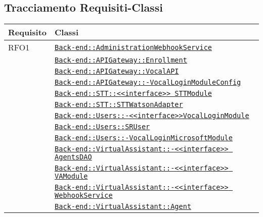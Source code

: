 \subsection{Tracciamento Requisiti-Classi}
\normalsize
\begin{longtable}{|>{\centering}m{3cm}|m{10cm}<{\centering}|}
\hline 
\textbf{Requisito} & \textbf{Classi}\\
\hline
\endhead
RFO1 & \hyperref[Back-end::AdministrationWebhookService]{\texttt{Back-end::AdministrationWebhookService}}\\
& \hyperref[Back-end::APIGateway::Enrollment]{\texttt{Back-end::APIGateway::Enrollment}}\\
& \hyperref[Back-end::APIGateway::VocalAPI]{\texttt{Back-end::APIGateway::VocalAPI}}\\
& \hyperref[Back-end::APIGateway::VocalLoginModuleConfig]{\texttt{Back-end::APIGateway::-\linebreak VocalLoginModuleConfig}}\\
& \hyperref[Back-end::STT::<<interface>> STTModule]{\texttt{Back-end::STT::<<interface>> STTModule}}\\
& \hyperref[Back-end::STT::STTWatsonAdapter]{\texttt{Back-end::STT::STTWatsonAdapter}}\\
& \hyperref[Back-end::Users::<<interface>>VocalLoginModule]{\texttt{Back-end::Users::-\linebreak <<interface>>VocalLoginModule}}\\
& \hyperref[Back-end::Users::SRUser]{\texttt{Back-end::Users::SRUser}}\\
& \hyperref[Back-end::Users::VocalLoginMicrosoftModule]{\texttt{Back-end::Users::-\linebreak VocalLoginMicrosoftModule}}\\
& \hyperref[Back-end::VirtualAssistant::<<interface>> AgentsDAO]{\texttt{Back-end::VirtualAssistant::-\linebreak <<interface>> AgentsDAO}}\\
& \hyperref[Back-end::VirtualAssistant::<<interface>> VAModule]{\texttt{Back-end::VirtualAssistant::-\linebreak <<interface>> VAModule}}\\
& \hyperref[Back-end::VirtualAssistant::<<interface>> WebhookService]{\texttt{Back-end::VirtualAssistant::-\linebreak <<interface>> WebhookService}}\\
& \hyperref[Back-end::VirtualAssistant::Agent]{\texttt{Back-end::VirtualAssistant::Agent}}\\

\end{longtable}
